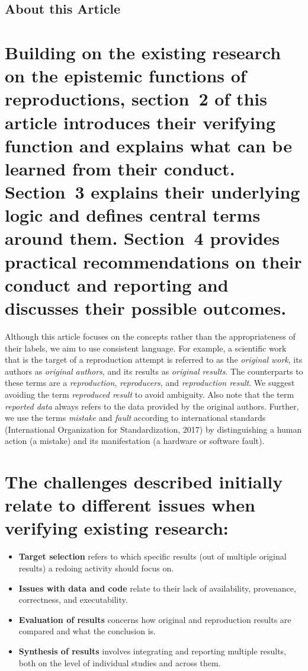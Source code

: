 \documentclass[authordate, empirical]{jote-new-article}
\begin{document}
	\subsection{About this Article}



	\section{Building on the existing research on the epistemic functions of reproductions, section 2 of this article introduces their verifying function and explains what can be learned from their conduct. Section 3 explains their underlying logic and defines central terms around them. Section 4 provides practical recommendations on their conduct and reporting and discusses their possible outcomes.}



	Although this article focuses on the concepts rather than the appropriateness of their labels, we aim to use consistent language. For example, a scientific work that is the target of a reproduction attempt is referred to as the \emph{original work}, its authors as \emph{original authors}, and its results as \emph{original results}. The counterparts to these terms are a \emph{reproduction}, \emph{reproducers}, and \emph{reproduction result}. We suggest avoiding the term \emph{reproduced result} to avoid ambiguity. Also note that the term \emph{reported data} always refers to the data provided by the original authors. Further, we use the terms \emph{mistake} and \emph{fault} according to international standards (International Organization for Standardization, 2017) by distinguishing a human action (a mistake) and its manifestation (a hardware or software fault).



	\section{The challenges described initially relate to different issues when verifying existing research:}

	\begin{itemize}


		\item \textbf{Target selection} refers to which specific results (out of multiple original results) a redoing activity should focus on.



		\item \textbf{Issues with data and code} relate to their lack of availability, provenance, correctness, and executability.



		\item \textbf{Evaluation of results} concerns how original and reproduction results are compared and what the conclusion is.



		\item \textbf{Synthesis of results} involves integrating and reporting multiple results, both on the level of individual studies and across them.


	\end{itemize}
\end{document}
